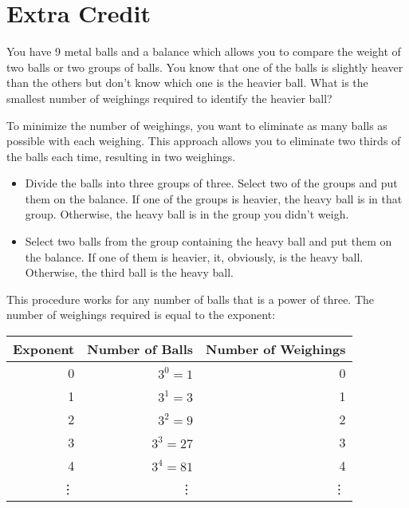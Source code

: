 \documentclass[letterpaper, landscape]{exam}
\begin{document}
\begin{questions}
\begin{parts}
    \end{parts}

    \section{Extra Credit}

    \question

    You have 9 metal balls and a balance which allows you to compare the weight of two balls or two
    groups of balls.  You know that one of the balls is slightly heaver than the others but don't know
    which one is the heavier ball.  What is the smallest number of weighings required to identify the
    heavier ball?

    \begin{solution}
      To minimize the number of weighings, you want to eliminate as many balls as possible with each
      weighing.  This approach allows you to eliminate two thirds of the balls each time, resulting in
      two weighings.

      \begin{itemize}
        \item 
          Divide the balls into three groups of three.  Select two of the groups and put them on the
          balance.  If one of the groups is heavier, the heavy ball is in that group.  Otherwise, the
          heavy ball is in the group you didn't weigh.

        \item 
          Select two balls from the group containing the heavy ball and put them on the balance.  If
          one of them is heavier, it, obviously, is the heavy ball.  Otherwise, the third ball is the
          heavy ball. 
      \end{itemize}

      This procedure works for any number of balls that is a power of three. The number of weighings
      required is equal to the exponent:

      \begin{tabular}{rrr}
        \toprule
        Exponent & Number of Balls & Number of Weighings \\
        \midrule
        0        & $3^0 = 1$       & 0 \\
        1        & $3^1 = 3$       & 1 \\
        2        & $3^2 = 9$       & 2 \\
        3        & $3^3 = 27$      & 3 \\
        4        & $3^4 = 81$      & 4 \\
        \vdots   & \vdots          & \vdots \\
        \bottomrule
      \end{tabular}


\end{solution}
\end{questions}
\end{document}
